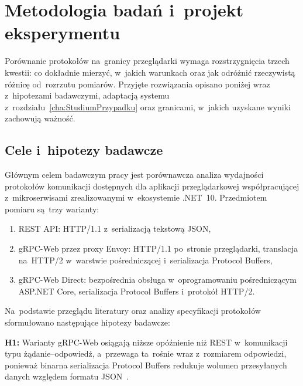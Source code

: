 \cleardoublepage

\chapter{Metodologia badań i~projekt eksperymentu}
\label{cha:MetodologiaBadan}

Porównanie protokołów na~granicy przeglądarki wymaga rozstrzygnięcia trzech kwestii: co dokładnie mierzyć, w~jakich warunkach oraz jak odróżnić rzeczywistą różnicę od~rozrzutu pomiarów. Przyjęte rozwiązania opisano poniżej wraz z~hipotezami badawczymi, adaptacją systemu z~rozdziału~\ref{cha:StudiumPrzypadku} oraz granicami, w~jakich uzyskane wyniki zachowują ważność.

\section{Cele i~hipotezy badawcze}
\label{sec:CeleHipotezy}

Głównym celem badawczym pracy jest porównawcza analiza wydajności protokołów komunikacji dostępnych dla aplikacji przeglądarkowej współpracującej z~mikroserwisami zrealizowanymi w~ekosystemie .NET~10. Przedmiotem pomiaru są~trzy warianty:

\begin{enumerate}
    \item REST API: HTTP/1.1 z~serializacją tekstową JSON,
    \item gRPC-Web przez proxy Envoy: HTTP/1.1 po~stronie przeglądarki, translacja na~HTTP/2 w~warstwie pośredniczącej i~serializacja Protocol Buffers,
    \item gRPC-Web Direct: bezpośrednia obsługa w~oprogramowaniu pośredniczącym ASP.NET Core, serializacja Protocol Buffers i~protokół HTTP/2.
\end{enumerate}

Na~podstawie przeglądu literatury oraz analizy specyfikacji protokołów sformułowano następujące hipotezy badawcze:

\begin{sloppypar}
\textbf{H1:} Warianty gRPC-Web osiągają niższe opóźnienie niż REST w~komunikacji typu żądanie--odpowiedź, a~przewaga ta~rośnie wraz z~rozmiarem odpowiedzi, ponieważ binarna serializacja Protocol Buffers redukuje wolumen przesyłanych danych względem formatu JSON~\cite{bib:ProtocolBuffers}.
\end{sloppypar}

